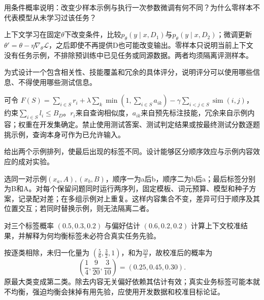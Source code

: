 
\begin{exercises}
\begin{exercise} 用条件概率说明：改变少样本示例与执行一次参数微调有何不同？为什么零样本不代表模型从未学习过该任务？

\begin{solution}
上下文学习在固定$\theta$下改变条件，比较$p_\theta(y\mid x,D_1)$与$p_\theta(y\mid x,D_2)$；微调更新$\theta'=\theta-\eta\nabla_\theta\mathcal L$，之后即使不再提供D也可能改变输出。零样本只说明当前上下文没有任务示例，不排除预训练中已见任务或同源数据。两者均须隔离评测样本。
\end{solution}
\end{exercise}

\begin{exercise} 为式设计一个包含相关性、技能覆盖和冗余的具体评分，说明评分可以使用哪些信息、不得使用哪些测试信息。

\begin{solution}
可令 $F(S)=\sum_{i\in S}r_i+\lambda\sum_k\min(1,\sum_{i\in S}a_{ik})-\gamma\sum_{i<j\in S}\operatorname{sim}(i,j)$，约束$\sum_{i\in S}l_i\le B_D$。$r_i$来自查询相似度，$a_{ik}$来自预先标注技能，冗余来自示例内容；权重在开发集确定。禁止使用测试答案、测试判定结果或按最终测试分数逐题挑示例，查询本身可作为已允许输入。
\end{solution}
\end{exercise}

\begin{exercise} 给出两个示例排列，使最后出现的标签不同。设计能够区分顺序效应与示例内容效应的成对实验。

\begin{solution}
选同一对示例$(x_a,A),(x_b,B)$，顺序一为a后b，顺序二为b后a；最后标签分别为B和A。对每个保留问题同时运行两序列，固定模板、词元预算、模型和种子方案，记录配对差；在多组示例对上重复。这样内容集合不变，差异可归于顺序及其位置交互；若同时替换示例，则无法隔离二者。
\end{solution}
\end{exercise}

\begin{exercise}\optional 对三个标签概率 $(0.5,0.3,0.2)$ 与偏好估计 $(0.6,0.2,0.2)$ 计算上下文校准结果，并解释为何均衡标签未必符合真实任务先验。

\begin{solution}
按逐类相除，未归一化量为 $(\frac{5}{6},\frac{3}{2},1)$，和为$\frac{10}{3}$，故校准后的概率为
\[
(\frac{1}{4},\frac{9}{20},\frac{3}{10})=(0.25,0.45,0.30).
\]
原最大类变成第二类。除去内容无关偏好依赖其估计有效；真实业务标签可能本就不均衡，强迫均衡会抹掉有用先验，应使用开发数据和校准目标论证。
\end{solution}
\end{exercise}


\end{exercises}
